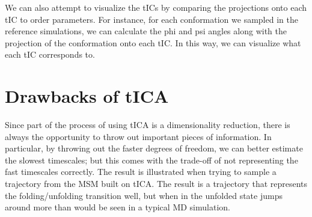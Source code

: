 \documentclass[12pt]{article}
\begin{document}
We can also attempt to visualize the tICs by comparing the projections onto each tIC to order parameters. For instance, for each conformation we sampled in the reference simulations, we can calculate the phi and psi angles along with the projection of the conformation onto each tIC. In this way, we can visualize what each tIC corresponds to.

\begin{figure}[h!]
\end{figure}

\section{Drawbacks of tICA}

Since part of the process of using tICA is a dimensionality reduction, there is always the opportunity to throw out important pieces of information. In particular, by throwing out the faster degrees of freedom, we can better estimate the slowest timescales; but this comes with the trade-off of not representing the fast timescales correctly. The result is illustrated when trying to sample a trajectory from the MSM built on tICA. The result is a trajectory that represents the folding/unfolding transition well, but when in the unfolded state jumps around more than would be seen in a typical MD simulation.


\end{document}
